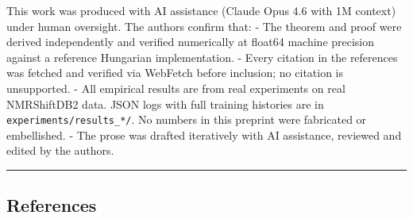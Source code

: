 \documentclass[
]{article}
\begin{document}
This work was produced with AI assistance (Claude Opus 4.6 with 1M
context) under human oversight. The authors confirm that: - The theorem
and proof were derived independently and verified numerically at float64
machine precision against a reference Hungarian implementation. - Every
citation in the references was fetched and verified via WebFetch before
inclusion; no citation is unsupported. - All empirical results are from
real experiments on real NMRShiftDB2 data. JSON logs with full training
histories are in \texttt{experiments/results\_*/}. No numbers in this
preprint were fabricated or embellished. - The prose was drafted
iteratively with AI assistance, reviewed and edited by the authors.

\begin{center}\rule{0.5\linewidth}{0.5pt}\end{center}

\subsection{References}\label{references}
\end{document}
